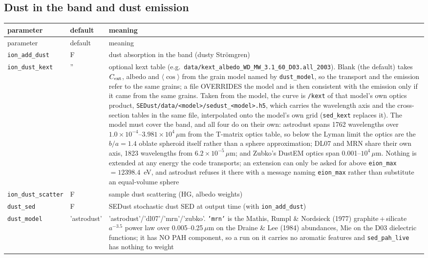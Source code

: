 \documentclass[english,a4paper]{my_memo}
\newcommand{\code}[1]{\texttt{#1}}
\begin{document}
\subsection{Dust in the band and dust emission}
\label{sec:sedust}
{\small
\begin{longtable}{llp{6.8cm}}
\toprule
parameter & default & meaning \\
\midrule
\endfirsthead
\toprule
parameter & default & meaning \\
\midrule
\endhead
\bottomrule
\endlastfoot
\code{ion\_add\_dust} & F & dust absorption in the band (dusty Str\"omgren) \\
\code{ion\_dust\_kext} & '' & optional kext table (e.g.\ \code{data/kext\_albedo\_WD\_MW\_3.1\_60\_D03.all\_2003}).  Blank (the default) takes $C_{\rm ext}$, albedo and $\langle\cos\rangle$ from the grain model named by \code{dust\_model}, so the transport and the emission refer to the same grains; a file OVERRIDES the model and is then consistent with the emission only if it came from the same grains.  Taken from the model, the curve is \code{/kext} of that model's own optics product, \code{SEDust/data/<model>/sedust\_<model>.h5}, which carries the wavelength axis and the cross-section tables in the same file, interpolated onto the model's own grid (\code{sed\_kext} replaces it).  The model must cover the band, and all four do on their own: astrodust spans 1762 wavelengths over $1.0{\times}10^{-4}$--$3.981{\times}10^{4}\,\mu$m from the T-matrix optics table, so below the Lyman limit the optics are the $b/a = 1.4$ oblate spheroid itself rather than a sphere approximation; DL07 and MRN share their own axis, 1823 wavelengths from $6.2{\times}10^{-5}\,\mu$m; and Zubko's DustEM optics span 0.001--$10^4\,\mu$m.  Nothing is extended at any energy the code transports; an extension can only be asked for above \code{eion\_max} $= 12398.4$~eV, and astrodust refuses it there with a message naming \code{eion\_max} rather than substitute an equal-volume sphere \\
\code{ion\_dust\_scatter} & F & sample dust scattering (HG, albedo weights) \\
\code{dust\_sed} & F & SEDust stochastic dust SED at output time (with \code{ion\_add\_dust}) \\
\code{dust\_model} & 'astrodust' & 'astrodust'/'dl07'/'mrn'/'zubko'.  \code{'mrn'} is the Mathis, Rumpl \& Nordsieck (1977) graphite\,+\,silicate $a^{-3.5}$ power law over 0.005--0.25\,$\mu$m on the Draine \& Lee (1984) abundances, Mie on the D03 dielectric functions; it has NO PAH component, so a run on it carries no aromatic features and \code{sed\_pah\_live} has nothing to weight \\

\end{longtable}}
\end{document}
